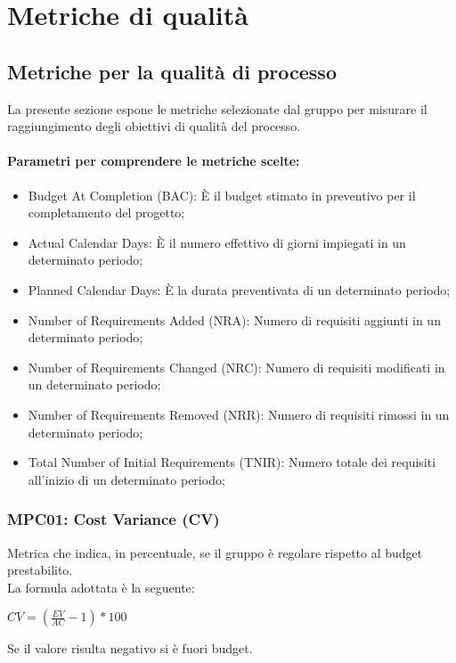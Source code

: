 \section{Metriche di qualità} \label{section:metriche_qualita}

\subsection{Metriche per la qualità di processo} \label{subsection:qualita_processo}
La presente sezione espone le metriche selezionate dal gruppo \groupName{} per misurare il raggiungimento degli obiettivi di qualità del processo.
    \paragraph*{Parametri per comprendere le metriche scelte:}
    \begin{itemize}
        \item Budget At Completion (BAC): È il budget stimato in preventivo per il completamento del progetto;
        \item Actual Calendar Days: È il numero effettivo di giorni impiegati in un determinato periodo;
        \item Planned Calendar Days: È la durata preventivata di un determinato periodo;
        \item Number of Requirements Added (NRA): Numero di requisiti aggiunti in un determinato periodo;
        \item Number of Requirements Changed (NRC): Numero di requisiti modificati in un determinato periodo;
        \item Number of Requirements Removed (NRR): Numero di requisiti rimossi in un determinato periodo;
        \item Total Number of Initial Requirements (TNIR): Numero totale dei requisiti all'inizio di un determinato periodo;
    \end{itemize}

    \subsubsection{MPC01: Cost Variance (CV)}
    Metrica che indica, in percentuale, se il gruppo è regolare rispetto al budget prestabilito.\\
    La formula adottata è la seguente:
    \begin{center}
        $CV = (\frac{EV}{AC}-1)*100$
    \end{center}
    Se il valore risulta negativo si è fuori budget.
    
